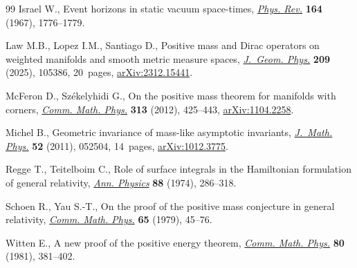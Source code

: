 \begin{thebibliography}{99}
Israel W., Event horizons in static vacuum space-times,
 \href{https://doi.org/10.1103/PhysRev.164.1776}{\textit{Phys. Rev.}}
 \textbf{164} (1967), 1776--1779.

Law M.B., Lopez I.M., Santiago D., Positive mass and {D}irac operators on
 weighted manifolds and smooth metric measure spaces,
 \href{https://doi.org/10.1016/j.geomphys.2024.105386}{\textit{J.~Geom.
 Phys.}} \textbf{209} (2025), 105386, 20~pages,
 \href{http://arxiv.org/abs/2312.15441}{arXiv:2312.15441}.

McFeron D., Sz\'{e}kelyhidi G., On the positive mass theorem for manifolds with
 corners, \href{https://doi.org/10.1007/s00220-012-1498-8}{\textit{Comm. Math.
 Phys.}} \textbf{313} (2012), 425--443,
 \href{http://arxiv.org/abs/1104.2258}{arXiv:1104.2258}.

Michel B., Geometric invariance of mass-like asymptotic invariants,
 \href{https://doi.org/10.1063/1.3579137}{\textit{J.~Math. Phys.}} \textbf{52}
 (2011), 052504, 14~pages,
 \href{http://arxiv.org/abs/1012.3775}{arXiv:1012.3775}.

Regge T., Teitelboim C., Role of surface integrals in the {H}amiltonian
 formulation of general relativity,
 \href{https://doi.org/10.1016/0003-4916(74)90404-7}{\textit{Ann. Physics}}
 \textbf{88} (1974), 286--318.

Schoen R., Yau S.-T., On the proof of the positive mass conjecture in general
 relativity, \href{https://doi.org/10.1007/BF01940959}{\textit{Comm. Math.
 Phys.}} \textbf{65} (1979), 45--76.

Witten E., A new proof of the positive energy theorem,
 \href{https://doi.org/10.1007/BF01208277}{\textit{Comm. Math. Phys.}}
 \textbf{80} (1981), 381--402.

\end{thebibliography}
